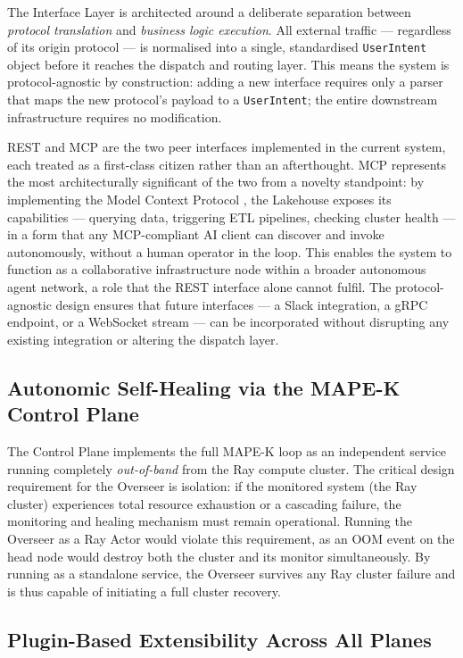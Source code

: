 \documentclass[12pt, a4paper]{report}
\begin{document}
The Interface Layer is architected around a deliberate separation between
\emph{protocol translation} and \emph{business logic execution}.
All external traffic — regardless of its origin protocol — is normalised into a
single, standardised \texttt{UserIntent} object before it reaches the dispatch
and routing layer.
This means the system is protocol-agnostic by construction: adding a new interface
requires only a parser that maps the new protocol's payload to a
\texttt{UserIntent}; the entire downstream infrastructure requires no modification.

REST and MCP are the two peer interfaces implemented in the current system,
each treated as a first-class citizen rather than an afterthought.
MCP represents the most architecturally significant of the two from a novelty
standpoint: by implementing the Model Context Protocol \citep{anthropic2024mcp},
the Lakehouse exposes its capabilities — querying data, triggering ETL pipelines,
checking cluster health — in a form that any MCP-compliant AI client can discover
and invoke autonomously, without a human operator in the loop.
This enables the system to function as a collaborative infrastructure node within
a broader autonomous agent network, a role that the REST interface alone
cannot fulfil.
The protocol-agnostic design ensures that future interfaces — a Slack integration,
a gRPC endpoint, or a WebSocket stream — can be incorporated without disrupting
any existing integration or altering the dispatch layer.

\subsection{Autonomic Self-Healing via the MAPE-K Control Plane}
\label{ssec:mapek_design}

The Control Plane implements the full MAPE-K loop \citep{kephart2003} as an independent
service running completely \emph{out-of-band} from the Ray compute cluster.
The critical design requirement for the Overseer is isolation: if the monitored system
(the Ray cluster) experiences total resource exhaustion or a cascading failure, the
monitoring and healing mechanism must remain operational.
Running the Overseer as a Ray Actor would violate this requirement, as an OOM event on
the head node would destroy both the cluster and its monitor simultaneously.
By running as a standalone service, the Overseer survives any Ray cluster failure and is
thus capable of initiating a full cluster recovery.

\subsection{Plugin-Based Extensibility Across All Planes}
\label{ssec:extensibility}
\end{document}
